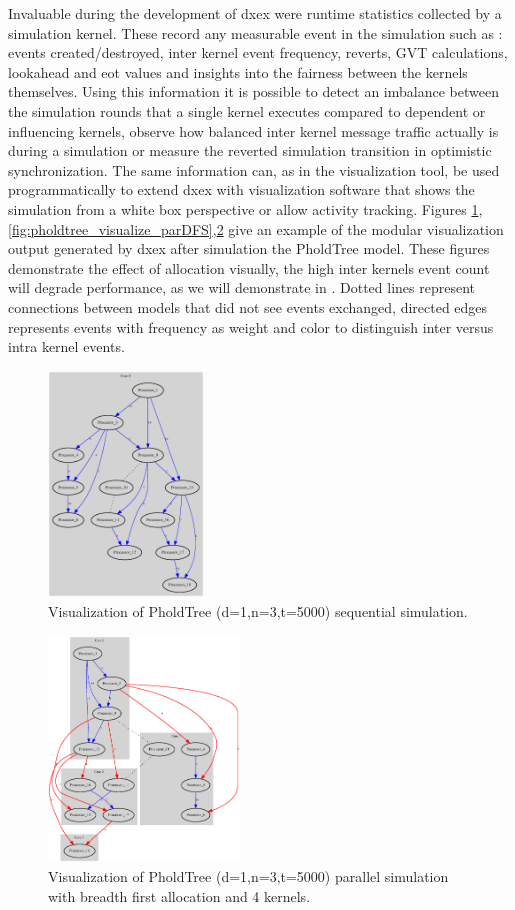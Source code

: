 Invaluable during the development of dxex were runtime statistics collected by a simulation kernel. These record any measurable event in the simulation such as : events created/destroyed, inter kernel event frequency, reverts, GVT calculations, lookahead and eot values and insights into the fairness between the kernels themselves. Using this information it is possible to detect an imbalance between the simulation rounds that a single kernel executes compared to dependent or influencing kernels, observe how balanced inter kernel message traffic actually is during a simulation or measure the reverted simulation transition in optimistic synchronization.
The same information can, as in the visualization tool, be used programmatically to extend dxex with visualization software that shows the simulation from a white box perspective or allow activity tracking.
Figures \ref{fig:pholdtree_visualize_seq},\ref{fig:pholdtree_visualize_parDFS},\ref{fig:pholdtree_visualize_parBFS} give an example of the modular visualization output generated by dxex after simulation the PholdTree model. These figures demonstrate the effect of allocation visually, the high inter kernels event count will degrade performance, as we will demonstrate in 
 . Dotted lines represent connections between models that did not see events exchanged, directed edges represents events with frequency as weight and color to distinguish inter versus intra kernel events.
\begin{figure}
	\center
	\includegraphics[width=\plotfraction\columnwidth, height=6cm, keepaspectratio]{fig/pholdtreed1n3t5000.eps}
	\caption{Visualization of PholdTree (d=1,n=3,t=5000) sequential simulation.}
	\label{fig:pholdtree_visualize_seq}
\end{figure}
\begin{figure}
	\center
	\includegraphics[width=\plotfraction\columnwidth,  height=6cm, keepaspectratio]{fig/pholdtreed1n3t5000c4BFS.eps}
	\caption{Visualization of PholdTree (d=1,n=3,t=5000) parallel simulation with breadth first allocation and 4 kernels.}
	\label{fig:pholdtree_visualize_parBFS}
\end{figure}
